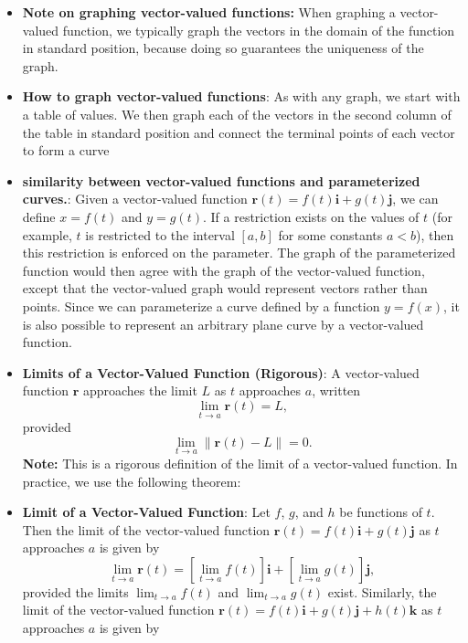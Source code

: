 \documentclass{report}
\begin{document}
\begin{itemize}
        \item \textbf{Note on graphing vector-valued functions:} When graphing a vector-valued function, we typically graph the vectors in the domain of the function in standard position, because doing so guarantees the uniqueness of the graph.
        \item \textbf{How to graph vector-valued functions}: As with any graph, we start with a table of values. We then graph each of the vectors in the second column of the table in standard position and connect the terminal points of each vector to form a curve
            \bigbreak \noindent 
        \item \textbf{similarity between vector-valued functions and parameterized curves.}:
            Given a vector-valued function \( \mathbf{r}(t) = f(t)\mathbf{i} + g(t)\mathbf{j} \), we can define \( x = f(t) \) and \( y = g(t) \). If a restriction exists on the values of \( t \) (for example, \( t \) is restricted to the interval \([a, b]\) for some constants \( a < b \)), then this restriction is enforced on the parameter. The graph of the parameterized function would then agree with the graph of the vector-valued function, except that the vector-valued graph would represent vectors rather than points. Since we can parameterize a curve defined by a function \( y = f(x) \), it is also possible to represent an arbitrary plane curve by a vector-valued function.
        \item \textbf{Limits of a Vector-Valued Function (Rigorous)}:
            A vector-valued function \(\mathbf{r}\) approaches the limit \(L\) as \(t\) approaches \(a\), written
            \[
                \lim_{t \to a} \mathbf{r}(t) = L,
            \]
            provided
            \[
                \lim_{t \to a} \|\mathbf{r}(t) - L\| = 0.
            \]
            \textbf{Note:} This is a rigorous definition of the limit of a vector-valued function. In practice, we use the following theorem:
        \item \textbf{Limit of a Vector-Valued Function}:
            Let \(f\), \(g\), and \(h\) be functions of \(t\). Then the limit of the vector-valued function  \(\mathbf{r}(t) = f(t)\mathbf{i} + g(t)\mathbf{j}\) as \(t\) approaches \(a\) is given by
            \[
                \lim_{t \to a} \mathbf{r}(t) = \left[ \lim_{t \to a} f(t) \right]\mathbf{i} + \left[ \lim_{t \to a} g(t) \right]\mathbf{j},
            \]
            provided the limits  \(\lim_{t \to a} f(t)\) and \(\lim_{t \to a} g(t)\) exist. Similarly, the limit of the vector-valued function  \(\mathbf{r}(t) = f(t)\mathbf{i} + g(t)\mathbf{j} + h(t)\mathbf{k}\) as \(t\) approaches \(a\) is given by

\end{itemize}
\end{document}
